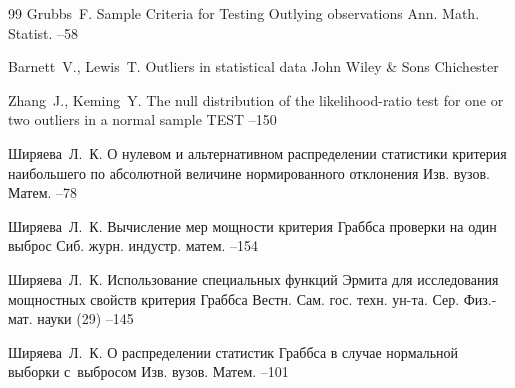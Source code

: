 \begin{thebibliography}{99}
\by  Grubbs~F.
\paper Sample Criteria for Testing Outlying observations
\jour Ann. Math. Statist.  
--58 

\by Barnett~V., Lewis~T.
\book Outliers in statistical data
\publ John Wiley \& Sons
\publaddr Chichester

\by Zhang~J., Keming~Y.
\paper  The null distribution of the likelihood-ratio test for one or two outliers in a normal sample
\jour TEST 
–150

\by Ширяева~Л.~К.
\paper О нулевом и альтернативном распределении статистики критерия наибольшего по абсолютной величине нормированного отклонения
\jour Изв. вузов. Матем.
--78

\by Ширяева~Л.~К.
\paper Вычисление мер мощности критерия Граббса проверки на один выброс
\jour Сиб. журн. индустр. матем.
--154

\by Ширяева~Л.~К.
\paper Использование специальных функций Эрмита для исследования мощностных свойств критерия Граббса
\jour Вестн. Сам. гос. техн. ун-та. Сер. Физ.-мат. науки
(29)
--145

\by Ширяева~Л.~К.
\paper О распределении статистик Граббса в случае нормальной выборки с~выбросом
\jour Изв. вузов. Матем.
--101



\end{thebibliography}
